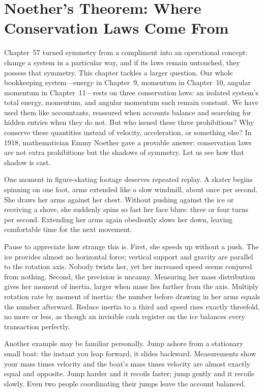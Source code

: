 \chapter[Noether's Theorem and Conservation Laws]{Noether's Theorem: Where Conservation Laws Come From}

Chapter~57 turned symmetry from a compliment into an operational concept: change a system in a particular way, and if its laws remain untouched, they possess that symmetry. This chapter tackles a larger question. Our whole bookkeeping system---energy in Chapter~9, momentum in Chapter~10, angular momentum in Chapter~11---rests on three conservation laws: an isolated system's total energy, momentum, and angular momentum each remain constant. We have used them like accountants, reassured when accounts balance and searching for hidden entries when they do not. But who issued these three prohibitions? Why conserve these quantities instead of velocity, acceleration, or something else? In 1918, mathematician Emmy Noether gave a provable answer: conservation laws are not extra prohibitions but the shadows of symmetry. Let us see how that shadow is cast.


One moment in figure-skating footage deserves repeated replay. A skater begins spinning on one foot, arms extended like a slow windmill, about once per second. She draws her arms against her chest. Without pushing against the ice or receiving a shove, she suddenly spins so fast her face blurs: three or four turns per second. Extending her arms again obediently slows her down, leaving comfortable time for the next movement.

Pause to appreciate how strange this is. First, she speeds up without a push. The ice provides almost no horizontal force; vertical support and gravity are parallel to the rotation axis. Nobody twists her, yet her increased speed seems conjured from nothing. Second, the precision is uncanny. Measuring her mass distribution gives her moment of inertia, larger when mass lies farther from the axis. Multiply rotation rate by moment of inertia: the number before drawing in her arms equals the number afterward. Reduce inertia to a third and speed rises exactly threefold, no more or less, as though an invisible cash register on the ice balances every transaction perfectly.

Another example may be familiar personally. Jump ashore from a stationary small boat: the instant you leap forward, it slides backward. Measurements show your mass times velocity and the boat's mass times velocity are almost exactly equal and opposite. Jump harder and it recoils faster; jump gently and it recoils slowly. Even two people coordinating their jumps leave the account balanced.

